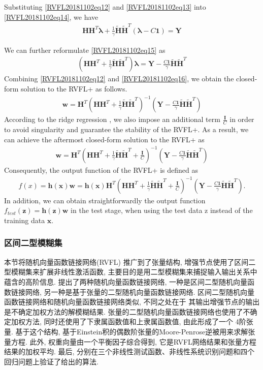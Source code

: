 Substituting \eqref{RVFL20181102eq12} and \eqref{RVFL20181102eq13} into \eqref{RVFL20181102eq14}, we have
\begin{align}
  \bm H \bm H^T  \bm \lambda + \frac 1 \gamma\tilde{\bm H} \tilde{\bm H}^T  (\bm \lambda -C \bm 1) = \bm Y \label{RVFL20181102eq15}
\end{align}

We can further reformulate \eqref{RVFL20181102eq15} as
\begin{align}
  \left(\bm H \bm H^T  + \frac 1 \gamma \tilde{\bm H} \tilde{\bm H}^T \right )\bm \lambda  = \bm Y - \frac {C \bm 1} {\gamma}\tilde{\bm H} \tilde{\bm H}^T  \label{RVFL20181102eq16}
\end{align}
Combining \eqref{RVFL20181102eq12} and \eqref{RVFL20181102eq16}, we obtain the closed-form solution to the RVFL+ as follows.
\begin{align}
\bm  w =\bm H^T \left(\bm H \bm H^T  + \frac 1 \gamma \tilde{\bm H} \tilde{\bm H}^T \right )^{-1} \left(\bm Y - \frac {C \bm 1} {\gamma}\tilde{\bm H} \tilde{\bm H}^T \right ) \label{RVFL20181102eq17}
\end{align}
According to the ridge regression \cite{Bishop2012-6469}, we also impose an additional term $\frac {\bm I} C $ in order to avoid singularity and guarantee the stability of the RVFL+. As a result, we can achieve the aftermost closed-form solution to the RVFL+ as
\begin{align}
\bm w = \bm H^T \left(\bm H \bm H^T  + \frac 1 \gamma \tilde{\bm H} \tilde{\bm H}^T +\frac{ \bm I} C \right)^{-1} \left(\bm Y -\frac {C \bm 1} {\gamma}\tilde{\bm H} \tilde{\bm H}^T \right )
\label{RVFL20181102eq18}
\end{align}
Consequently, the output function of the RVFL+ is defined as
\begin{align}
  f(x) =\bm  h (\bm x)\bm w =\bm h(\bm  x)\bm H^ T \left(\bm H \bm H^T  +\frac 1 \gamma\tilde{\bm H} \tilde{\bm H}^T  +\frac{\bm  I} C \right)^{-1}\left(\bm Y - \frac {C \bm 1} {\gamma}\tilde{\bm H} \tilde{\bm H}^T \right ).
\end{align}
In addition, we can obtain straightforwardly the output function $f_{test}(\bm z) = \bm h(\bm z)\bm w$ in the test stage, when using the test data z instead of the training data $\bm x$.
\subsubsection{区间二型模糊集}
本节将随机向量函数链接网络(RVFL) 推广到了张量结构,  增强节点使用了区间二型模糊集来扩展非线性激活函数, 主要目的是用二型模糊集来捕捉输入输出关系中蕴含的高阶信息.
提出了两种随机向量函数链接网络, 一种是区间二型随机向量函数链接网络, 另一种是基于张量的二型随机向量函数链接网络.
区间二型随机向量函数链接网络和随机向量函数链接网络类似, 不同之处在于 其输出增强节点的输出是不确定加权方法的解模糊结果.
张量的二型随机向量函数链接网络也使用了不确定加权方法, 同时还使用了下隶属函数值和上隶属函数值, 由此形成了一个 4阶张量.
基于这个结构, 基于Einstein积的偶数阶张量的Moore-Penrose逆被用来求解张量方程.
此外, 权重向量由一个平衡因子综合得到, 它是RVFL网络结果和张量方程结果的加权平均.
最后, 分别在三个非线性测试函数、非线性系统识别问题和四个回归问题上验证了给出的算法.


